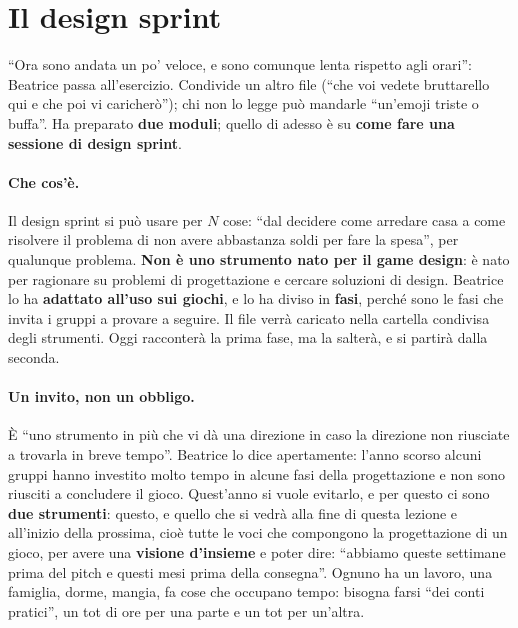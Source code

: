 \section{Il design sprint}
\label{a7:sec:sprint}



``Ora sono andata un po' veloce, e sono comunque lenta rispetto agli orari'':
Beatrice passa all'esercizio. Condivide un altro file (``che voi vedete bruttarello
qui e che poi vi caricherò''); chi non lo legge può mandarle ``un'emoji triste o
buffa''. Ha preparato \textbf{due moduli}; quello di adesso è su \textbf{come fare una
sessione di design sprint}.

\paragraph{Che cos'è.} Il design sprint si può usare per $N$ cose: ``dal decidere
come arredare casa a come risolvere il problema di non avere abbastanza soldi per
fare la spesa'', per qualunque problema. \textbf{Non è uno strumento nato per il game
design}: è nato per ragionare su problemi di progettazione e cercare soluzioni di
design. Beatrice lo ha \textbf{adattato all'uso sui giochi}, e lo ha diviso in
\textbf{fasi}, perché sono le fasi che invita i gruppi a provare a seguire. Il file
verrà caricato nella cartella condivisa degli strumenti. Oggi racconterà la prima
fase, ma la salterà, e si partirà dalla seconda.

\paragraph{Un invito, non un obbligo.} È ``uno strumento in più che vi dà una
direzione in caso la direzione non riusciate a trovarla in breve tempo''. Beatrice lo
dice apertamente: l'anno scorso alcuni gruppi hanno investito molto tempo in alcune
fasi della progettazione e non sono riusciti a concludere il gioco. Quest'anno si
vuole evitarlo, e per questo ci sono \textbf{due strumenti}: questo, e quello che si
vedrà alla fine di questa lezione e all'inizio della prossima, cioè tutte le voci che
compongono la progettazione di un gioco, per avere una \textbf{visione d'insieme} e
poter dire: ``abbiamo queste settimane prima del pitch e questi mesi prima della
consegna''. Ognuno ha un lavoro, una famiglia, dorme, mangia, fa cose che occupano
tempo: bisogna farsi ``dei conti pratici'', un tot di ore per una parte e un tot per
un'altra.

